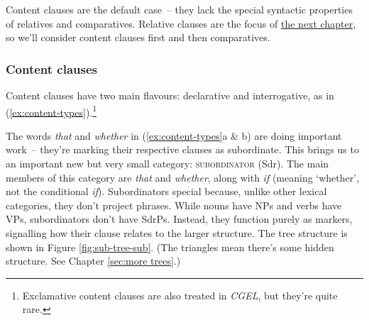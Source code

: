 \ea \label{ex:sub-types}
    \z
\z

Content clauses are the default case~-- they lack the special syntactic properties of relatives and comparatives. Relative clauses are the focus of \href{ch:relatives}{the next chapter}, so we'll consider content clauses first and then comparatives.

\subsubsection{Content clauses}

Content clauses have two main flavours: declarative and interrogative, as in (\ref{ex:content-types}).\footnote{Exclamative content clauses are also treated in \textit{CGEL}, but they're quite rare.}

\ea \label{ex:content-types}
    \z
\z

The words \textit{that} and \textit{whether} in (\ref{ex:content-types}a \& b) are doing important work~-- they're marking their respective clauses as subordinate. This brings us to an important new but very small category: \textsc{subordinator} (Sdr). The main members of this category are \textit{that} and \textit{whether}, along with \textit{if} (meaning `whether', not the conditional \textit{if}). Subordinators special because, unlike other lexical categories, they don't project phrases. While nouns have NPs and verbs have VPs, subordinators don't have SdrPs. Instead, they function purely as markers, signalling how their clause relates to the larger structure. The tree structure is shown in Figure \ref{fig:sub-tree-sub}. (The triangles mean there's some hidden structure. See Chapter \ref{sec:more trees}.)

